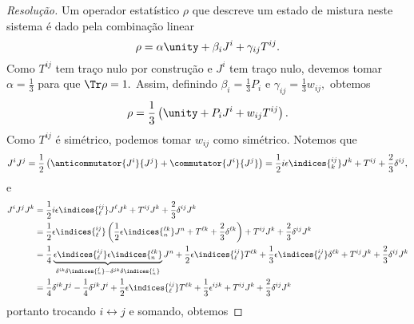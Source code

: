\begin{proof}[Resolução]
    Um operador estatístico \(\rho\) que descreve um estado de mistura neste sistema é dado pela combinação linear
    \begin{equation*}
        \rho = \alpha\unity + \beta_i J^i + \gamma_{ij} T^{ij}.
    \end{equation*}
    Como \(T^{ij}\) tem traço nulo por construção e \(J^i\) tem traço nulo, devemos tomar \(\alpha = \frac13\) para que \(\Tr\rho = 1.\) Assim, definindo \(\beta_i = \frac13 P_i\) e \(\gamma_{ij} = \frac13 w_{ij},\) obtemos
    \begin{equation*}
        \rho = \frac13 \left(\unity + P_i J^i + w_{ij} T^{ij}\right).
    \end{equation*}
    Como \(T^{ij}\) é simétrico, podemos tomar \(w_{ij}\) como simétrico.
    Notemos que
    \begin{equation*}
        J^{i} J^{j} = \frac12 \left(\anticommutator{J^i}{J^j} + \commutator{J^i}{J^j}\right) = \frac12i\epsilon\indices{^{ij}_k} J^k + T^{ij} + \frac{2}{3} \delta^{ij},
    \end{equation*}
    e
    \begin{align*}
        J^i J^j J^k &= \frac12i\epsilon\indices{^{ij}_\ell} J^\ell J^k  + T^{ij}J^k + \frac23 \delta^{ij} J^k\\
                    &= \frac12 \epsilon\indices{^{ij}_\ell}\left(\frac12 \epsilon\indices{^{\ell k}_n} J^n + T^{\ell k} + \frac23 \delta^{\ell k}\right) + T^{ij} J^k + \frac23 \delta^{ij} J^k\\
                    &= \frac14 \underbrace{\epsilon\indices{^{ij}_{\ell}} \epsilon\indices{^{\ell k}_n}}_{\delta^{ik} \delta\indices{^j_n} - \delta^{jk}\delta\indices{^i_n}} J^n + \frac12 \epsilon\indices{^{ij}_{\ell}} T^{\ell k} + \frac13 \epsilon\indices{^{ij}_{\ell}} \delta^{\ell k} + T^{ij} J^k + \frac23 \delta^{ij} J^k\\
                    &= \frac14 \delta^{ik} J^j - \frac14 \delta^{jk} J^i + \frac12 \epsilon\indices{^{ij}_\ell} T^{\ell k} + \frac13 \epsilon^{ijk} + T^{ij}J^k + \frac23 \delta^{ij} J^k
    \end{align*}
    portanto trocando \(i \leftrightarrow j\) e somando, obtemos

\end{proof}
